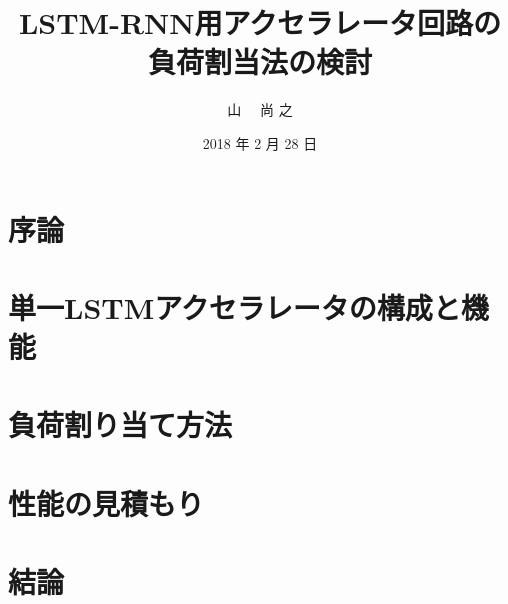 \documentclass[mingoth]{kut-paper}		%
\title{LSTM-RNN用アクセラレータ回路の負荷割当法の検討}
\author{山 \UTF{FA11} ~~尚 之}
\date{2018 年 2 月 28 日}
\begin{document}
\maketitle

\chapter{序論}


\chapter{単一LSTMアクセラレータの構成と機能}


\chapter{負荷割り当て方法}


\chapter{性能の見積もり}


\chapter{結論}


\begin{acknowledgement}
%
\end{acknowledgement}


\begin{thebibliography}{99}
%
\end{thebibliography}


\appendix

\chapter{}
%

\chapter{}
%
\end{document}
